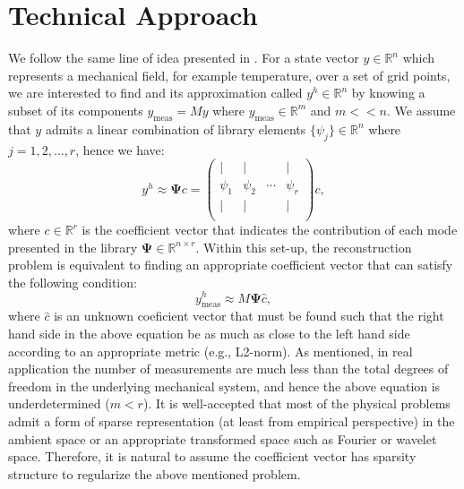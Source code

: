 \documentclass[conference]{IEEEtran}
\begin{document}
\section{Technical Approach}
We follow the same line of idea presented in \cite{CallahamRobust2019,WrightRobust2008}. For a state vector $y \in \mathbb{R}^n$ which represents a mechanical field, for example temperature, over a set of grid points, we are interested to find and its approximation called $y^h \in \mathbb{R}^n$ by knowing a subset of its components $y_{\text{meas}} = M y$ where $y_{\text{meas}} \in \mathbb{R}^m$ and $m<<n$. We assume that $y$ admits a linear combination of library elements $\{ \psi_j \} \in \mathbb{R}^n$ where $j=1,2,\dots,r$, hence we have:
\begin{equation}
y^h \approx \mathbf{\Psi} c = 
\begin{pmatrix}
\mid & \mid & & \mid \\
\psi_1 & \psi_2 & \cdots & \psi_r\\
\mid & \mid & & \mid \\
\end{pmatrix}
c,
\end{equation}
where $c \in \mathbb{R}^r$ is the coefficient vector that indicates the contribution of each mode presented in the library $\mathbf{\Psi} \in \mathbb{R}^{n\times r}$. Within this set-up, the reconstruction problem is equivalent to finding an appropriate coefficient vector that can satisfy the following condition:
\begin{equation}
y_{\text{meas}}^h \approx M\mathbf{\Psi}\hat{c},
\end{equation}
where $\hat{c}$ is an unknown coeficient vector that must be found such that the right hand side in the above equation be as much as close to the left hand side according to an appropriate metric (e.g., L2-norm). As mentioned, in real application the number of measurements are much less than the total degrees of freedom in the underlying mechanical system, and hence the above equation is underdetermined ($m<r$). It is well-accepted that most of the physical problems admit a form of sparse representation (at least from empirical perspective) in the ambient space or an appropriate transformed space such as Fourier or wavelet space. Therefore, it is natural to assume the coefficient vector has sparsity structure to regularize the above mentioned problem.
\end{document}
